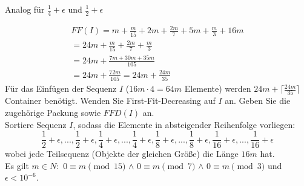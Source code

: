 \documentclass{article}
\begin{document}
Analog für $\frac{1}{4}+\epsilon$ und $\frac{1}{2}+\epsilon$

\begin{align*}
FF(I)=m+\frac{m}{15}+2m+\frac{2m}{7}+5m+\frac{m}{3}+16m\\
=24m+\frac{m}{15}+\frac{2m}{7}+\frac{m}{3}\\
=24m+\frac{7m+30m+35m}{105}\\
=24m+\frac{72m}{105}
=24m+\frac{24m}{35}
\end{align*}
Für das Einfügen der Sequenz $I$ ($16m\cdot4=64m$ Elemente) werden $24m+\lceil\frac{24m}{35}\rceil$ Container benötigt.
\newpage
Wenden Sie First-Fit-Decreasing auf $I$ an. Geben Sie die zugehörige Packung sowie $FFD(I)$ an.\\
Sortiere Sequenz $I$, sodass die Elemente in absteigender Reihenfolge vorliegen:\\
\begin{equation}
\frac{1}{2}+\epsilon,...,\frac{1}{2}+\epsilon,\frac{1}{4}+\epsilon,...,\frac{1}{4}+\epsilon,\frac{1}{8}+\epsilon,...,\frac{1}{8}+\epsilon,\frac{1}{16}+\epsilon,...,\frac{1}{16}+\epsilon
\end{equation}
wobei jede Teilsequenz (Objekte der gleichen Größe) die Länge $16m $ hat.\\ Es gilt $m\in N: $ $0 \equiv m \pmod{15}$ $\wedge$ $0 \equiv m \pmod{7}$ $\wedge$ $0 \equiv m \pmod{3}$ und $\epsilon < 10^{-6}$.
\end{document}
